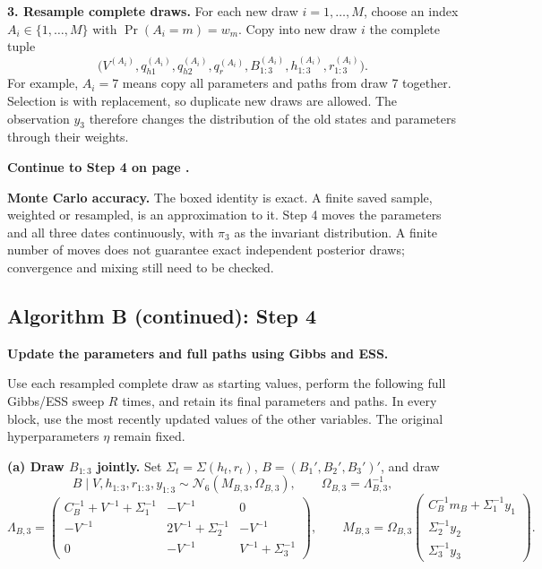 \documentclass[10pt,a4paper]{article}
\newcommand{\N}{\mathcal N}
\begin{document}
\textbf{3. Resample complete draws.}
For each new draw $i=1,\ldots,M$, choose an index $A_i\in\{1,\ldots,M\}$
with $\Pr(A_i=m)=w_m$. Copy into new draw $i$ the complete tuple
\[
\bigl(V^{(A_i)},q_{h1}^{(A_i)},q_{h2}^{(A_i)},q_r^{(A_i)},
B_{1:3}^{(A_i)},h_{1:3}^{(A_i)},r_{1:3}^{(A_i)}\bigr).
\]
For example, $A_i=7$ means copy all parameters and paths from draw 7
together. Selection is with replacement, so duplicate new draws are allowed.
The observation $y_3$ therefore changes the distribution of the old states and
parameters through their weights.

\textbf{Continue to Step 4 on page \pageref{alg-b-step4}.}

\textbf{Monte Carlo accuracy.}
The boxed identity is exact. A finite saved sample, weighted or resampled,
is an approximation to it. Step 4 moves the parameters and all three dates
continuously, with $\pi_3$ as the invariant distribution. A finite number of
moves does not guarantee exact independent posterior draws; convergence and
mixing still need to be checked.

\clearpage
\subsection*{Algorithm B (continued): Step 4}
\label{alg-b-step4}

\textbf{Update the parameters and full paths using Gibbs and ESS.}

Use each resampled complete draw as starting values, perform the following
full Gibbs/ESS sweep $R$ times, and retain its final parameters and paths.
In every block, use the most recently updated values of the other variables.
The original hyperparameters $\eta$ remain fixed.

\textbf{(a) Draw $B_{1:3}$ jointly.}
Set $\Sigma_t=\Sigma(h_t,r_t)$, $B=(B_1',B_2',B_3')'$, and draw
\[
B\mid V,h_{1:3},r_{1:3},y_{1:3}\sim\N_6(M_{B,3},\Omega_{B,3}),
\qquad\Omega_{B,3}=\Lambda_{B,3}^{-1},
\]
\[
\Lambda_{B,3}=\begin{pmatrix}
C_B^{-1}+V^{-1}+\Sigma_1^{-1}&-V^{-1}&0\\
-V^{-1}&2V^{-1}+\Sigma_2^{-1}&-V^{-1}\\
0&-V^{-1}&V^{-1}+\Sigma_3^{-1}
\end{pmatrix},
\qquad
M_{B,3}=\Omega_{B,3}\begin{pmatrix}
C_B^{-1}m_B+\Sigma_1^{-1}y_1\\
\Sigma_2^{-1}y_2\\
\Sigma_3^{-1}y_3
\end{pmatrix}.
\]
\end{document}
